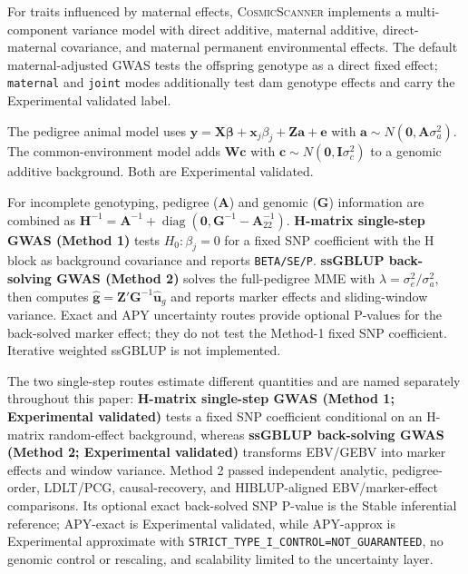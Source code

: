 \documentclass[11pt,a4paper]{article}
\newcommand{\CosmicScanner}{\textsc{CosmicScanner}}
\begin{document}
For traits influenced by maternal effects, \CosmicScanner{} implements a multi-component variance model with direct additive, maternal additive, direct-maternal covariance, and maternal permanent environmental effects. The default maternal-adjusted GWAS tests the offspring genotype as a direct fixed effect; \texttt{maternal} and \texttt{joint} modes additionally test dam genotype effects and carry the Experimental validated label.

The pedigree animal model uses $\mathbf{y}=\mathbf{X}\boldsymbol{\beta}+\mathbf{x}_j\beta_j+\mathbf{Z}\mathbf{a}+\mathbf{e}$ with $\mathbf{a}\sim N(\mathbf{0},\mathbf{A}\sigma_a^2)$. The common-environment model adds $\mathbf{W}\mathbf{c}$ with $\mathbf{c}\sim N(\mathbf{0},\mathbf{I}\sigma_c^2)$ to a genomic additive background. Both are Experimental validated.

For incomplete genotyping, pedigree ($\mathbf{A}$) and genomic ($\mathbf{G}$) information are combined as $\mathbf{H}^{-1}=\mathbf{A}^{-1}+\operatorname{diag}(\mathbf{0},\mathbf{G}^{-1}-\mathbf{A}_{22}^{-1})$. \textbf{H-matrix single-step GWAS (Method 1)} tests $H_0:\beta_j=0$ for a fixed SNP coefficient with the H block as background covariance and reports \texttt{BETA/SE/P}. \textbf{ssGBLUP back-solving GWAS (Method 2)} solves the full-pedigree MME \citep{aguilar2010,legarra2009,christensen2010} with $\lambda=\sigma_e^2/\sigma_a^2$, then computes $\hat{\mathbf{g}}=\mathbf{Z}'\mathbf{G}^{-1}\hat{\mathbf{u}}_g$ \citep{vanraden2008,stranden2009,wang2012} and reports marker effects and sliding-window variance. Exact and APY uncertainty routes provide optional P-values for the back-solved marker effect; they do not test the Method-1 fixed SNP coefficient. Iterative weighted ssGBLUP is not implemented.

The two single-step routes estimate different quantities and are named separately throughout this paper: \textbf{H-matrix single-step GWAS (Method 1; Experimental validated)} tests a fixed SNP coefficient conditional on an H-matrix random-effect background, whereas \textbf{ssGBLUP back-solving GWAS (Method 2; Experimental validated)} transforms EBV/GEBV into marker effects and window variance. Method 2 passed independent analytic, pedigree-order, LDLT/PCG, causal-recovery, and HIBLUP-aligned EBV/marker-effect comparisons. Its optional exact back-solved SNP P-value is the Stable inferential reference; APY-exact is Experimental validated, while APY-approx is Experimental approximate with \texttt{STRICT\_TYPE\_I\_CONTROL=NOT\_GUARANTEED}, no genomic control or rescaling, and scalability limited to the uncertainty layer.
\end{document}
